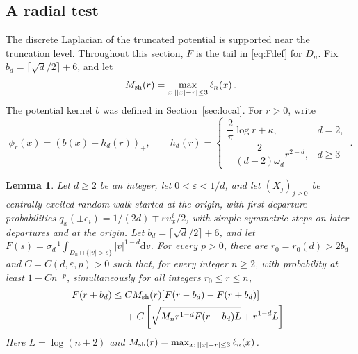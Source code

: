 \documentclass[11pt]{amsart}
\theoremstyle{plain}
\newtheorem{lemma}[theorem]{Lemma}
\theoremstyle{definition}
\newcommand{\eps}{\varepsilon}
\newcommand{\dd}{\mathrm d}
\begin{document}
\subsection{A radial test}
The discrete Laplacian of the truncated potential is supported near
the truncation level.
Throughout this section, $F$ is the tail in \eqref{eq:Fdef} for $D_n$.
Fix $b_d=\lceil\sqrt d/2\rceil+6$, and let
\begin{equation}\label{eq:shell-def}
M_{\rm sh}(r)=\max_{x:||x|-r|\leq3}\ell_n(x)\, .
\end{equation}
The potential kernel $b$ was defined in Section~\ref{sec:local}.
For $r>0$, write
\begin{equation}\label{eq:radial-test}
\phi_r(x)=(b(x)-h_d(r))_+ ,\qquad
h_d(r)=\begin{cases}
\dfrac2\pi\log r+\kappa,&d=2,\\[3pt]
-\dfrac2{(d-2)\omega_d}r^{2-d},&d\geq3
\end{cases}\, .
\end{equation}

\begin{lemma}\label{lem:radial}
Let $d\geq2$ be an integer, let $0<\eps<1/d$, and let $(X_j)_{j\geq0}$ be centrally
excited random walk started at the origin, with first-departure probabilities
$q_x(\pm e_i)=1/(2d)\mp\eps u_x^i/2$, with simple symmetric
steps on later departures and at the origin.
Let $b_d=\lceil\sqrt d/2\rceil+6$, and let
$F(s)=\sigma_d^{-1}\int_{D_n\cap\{|v|>s\}}|v|^{1-d}\dd v$.
For every $p>0$, there are $r_0=r_0(d)>2b_d$ and $C=C(d,\eps,p)>0$
such that, for every integer $n\geq2$, with probability at least
$1-Cn^{-p}$, simultaneously for
all integers $r_0\leq r\leq n$,
\begin{equation}\label{eq:radial}
\begin{split}
F(r+b_d)\leq{}&CM_{\rm sh}(r)
 [F(r-b_d)-F(r+b_d)]\\
&+C\left[\sqrt{M_nr^{1-d}F(r-b_d)L}+r^{1-d}L\right]\, .
\end{split}
\end{equation}
Here $L=\log(n+2)$ and
$M_{\rm sh}(r)=\max_{x:\,||x|-r|\leq3}\ell_n(x)$.
\end{lemma}
\end{document}
